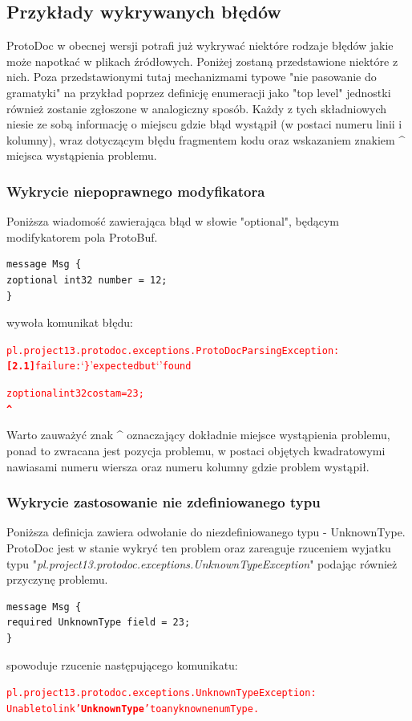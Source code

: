 \documentclass[a4paper]{article}
\begin{document}
\newpage
\subsection{Przykłady wykrywanych błędów}
ProtoDoc w obecnej wersji potrafi już wykrywać niektóre rodzaje błędów jakie może napotkać w plikach źródłowych.
Poniżej zostaną przedstawione niektóre z nich. Poza przedstawionymi tutaj mechanizmami typowe "nie pasowanie do gramatyki" 
na przykład poprzez definicję enumeracji jako "top level" jednostki również zostanie zgłoszone w analogiczny sposób. 
Każdy z tych składniowych niesie ze sobą informację o miejscu gdzie błąd wystąpił (w postaci numeru linii i kolumny), 
wraz dotyczącym błędu fragmentem kodu oraz wskazaniem znakiem \textbf{\^} miejsca wystąpienia problemu.

\subsubsection{Wykrycie niepoprawnego modyfikatora}
Poniższa wiadomość zawierająca błąd w słowie "optional", będącym modifykatorem pola ProtoBuf.
\begin{verbatim}
message Msg {
zoptional int32 number = 12;
}
\end{verbatim}

wywoła komunikat błędu:
\begin{alltt}
\textcolor{Red}{pl.project13.protodoc.exceptions.ProtoDocParsingException: 
\textbf{[2.1]} failure: `\}' expected but `' found 

zoptional int32 costam = 23;
\textbf{\^} }
\end{alltt}
Warto zauważyć znak \textbf{\^} oznaczający dokładnie miejsce wystąpienia problemu, ponad to zwracana jest pozycja problemu, w postaci objętych
kwadratowymi nawiasami numeru wiersza oraz numeru kolumny gdzie problem wystąpił.

\subsubsection{Wykrycie zastosowanie nie zdefiniowanego typu}
Poniższa definicja zawiera odwołanie do niezdefiniowanego typu - UnknownType. ProtoDoc jest w stanie wykryć ten problem oraz zareaguje 
rzuceniem wyjatku typu "\textit{pl.project13.protodoc.exceptions.UnknownTypeException}" podając również przyczynę problemu.
\begin{verbatim}
message Msg {
required UnknownType field = 23;
} 
\end{verbatim}
spowoduje rzucenie następującego komunikatu:
\begin{alltt}
\textcolor{Red}{pl.project13.protodoc.exceptions.UnknownTypeException: 
Unable to link '\textbf{UnknownType}' to any known enum Type.}
\end{alltt}
\end{document}
